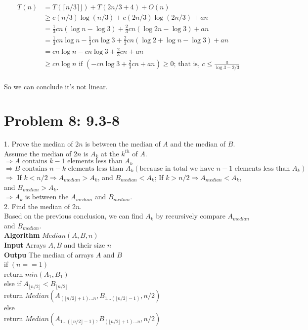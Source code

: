 \documentclass[a4paper]{article}
\begin{document}
\begin{align*}
    T(n) & = T(\lceil{n/3}\rceil⌋)+T(2n/3+4) + O(n) \\
    & \geq c(n/3)\log (n/3)+c(2n/3)\log (2n/3) + an \\
    & =\frac{1}{3}cn(\log n -\log 3)+\frac{2}{3}cn(\log 2n -\log 3) + an\\
    & =\frac{1}{3}cn\log n -\frac{1}{3}cn\log 3+\frac{2}{3}cn(\log 2 + \log n -\log 3) + an\\
    & = cn\log n -cn\log 3+\frac{2}{3}cn + an\\
    & \geq cn\log n \text{ if } (-cn\log 3+\frac{2}{3}cn + an)\geq0 \text{; that is, } c\leq \frac{a}{\log 3 - 2/3} \\
\end{align*}

So we can conclude it's not linear.

\section{Problem 8: 9.3-8} 
1. Prove the median of $2n$ is between the median of $A$ and the median of $B$.\\
Assume the median of $2n$ is $A_k$ at the $k^{th}$ of $A$.\\
$\Rightarrow A \text{ contains } k-1 \text{ elements less than } A_k$\\
$\Rightarrow B \text{ contains } n-k \text{ elements less than } A_k (\text{because in total we have } n-1 \text{ elements less than } A_k)$\\
$\Rightarrow$ If $k<n/2\Rightarrow A_{median}>A_k$, and $B_{median}<A_k$; If $k>n/2\Rightarrow A_{median}<A_k$, and $B_{median}>A_k$.\\
$\Rightarrow A_k$ is between the $A_{median}$ and $B_{median}$.\\

2. Find the median of $2n$.\\
Based on the previous conclusion, we can find $A_k$ by recursively compare $A_{median}$ and $B_{median}$.\\
\textbf{Algorithm} $Median(A,B,n)$\\
\textbf{Input} Arrays $A, B$ and their size $n$\\
\textbf{Outpu} The median of arrays $A$ and $B$\\
\hspace*{1cm}if $(n==1)$\\
\hspace*{2cm}return $min(A_1, B_1)$\\
\hspace*{1cm}else if $A_{\lfloor{n/2}\rfloor} < B_{\lfloor{n/2}\rfloor}$\\
\hspace*{2cm}return $Median(A_{(\lfloor{n/2}\rfloor+1)\dots n}, B_{1\dots(\lfloor{n/2}\rfloor-1)}, n/2)$\\
\hspace*{1cm}else\\
\hspace*{2cm}return $Median(A_{1\dots(\lfloor{n/2}\rfloor-1)}, B_{(\lfloor{n/2}\rfloor+1)\dots n}, n/2)$\\
\end{document}
